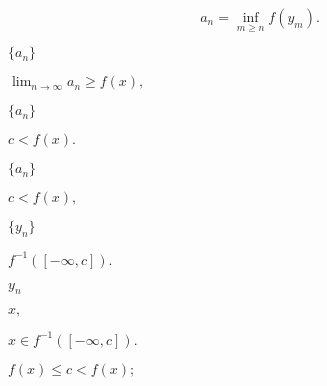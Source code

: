\documentclass[10pt]{book}
\begin{document}
\begin{mdSnippets}
\begin{mdDisplaySnippet}[5223833882380dcaffcf5139cb0c56ac]%
\[%
a_n = \inf_{m \ge n} f(y_m).
\]%
\end{mdDisplaySnippet}%
\begin{mdInlineSnippet}[9c9115fa32bb44c03cd41e220f351e4c]%
$\{a_n\}$\end{mdInlineSnippet}%
\begin{mdInlineSnippet}%
$\lim_{n \to \infty} a_n \ge f(x),$\end{mdInlineSnippet}%
\begin{mdInlineSnippet}[9c9115fa32bb44c03cd41e220f351e4c]%
$\{a_n\}$\end{mdInlineSnippet}%
\begin{mdInlineSnippet}[d3c94338406e158dfc775878383b1a9b]%
$c < f(x).$\end{mdInlineSnippet}%
\begin{mdInlineSnippet}[9c9115fa32bb44c03cd41e220f351e4c]%
$\{a_n\}$\end{mdInlineSnippet}%
\begin{mdInlineSnippet}[0c32250defe8a068e32972d9575867fc]%
$c < f(x),$\end{mdInlineSnippet}%
\begin{mdInlineSnippet}%
$\{y_n\}$\end{mdInlineSnippet}%
\begin{mdInlineSnippet}[6670d6129d8901ed2e5931cd81d83a5a]%
$f^{-1}([-\infty, c]).$\end{mdInlineSnippet}%
\begin{mdInlineSnippet}%
$y_n$\end{mdInlineSnippet}%
\begin{mdInlineSnippet}[0e503e6ba8df74a61723be29415bcdc5]%
$x,$\end{mdInlineSnippet}%
\begin{mdInlineSnippet}[6498ff0cafaef306a073799c9cb91a4a]%
$x \in f^{-1}([-\infty, c]).$\end{mdInlineSnippet}%
\begin{mdInlineSnippet}[64aeb0854b6be22f9260ec37b284b802]%
$f(x) \le c < f(x);$\end{mdInlineSnippet}%

\end{mdSnippets}
\end{document}
